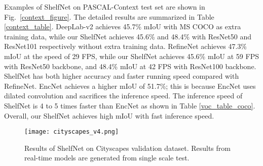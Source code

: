 \documentclass[10pt,twocolumn,letterpaper]{article}
\begin{document}
Examples of ShelfNet on PASCAL-Context test set are shown in Fig.~\ref{context_figure}. The detailed results are summarized in Table \ref{context_table}. DeepLab-v2 achieves 45.7\% mIoU with MS COCO as extra training data, while our ShelfNet achieves 45.6\% and 48.4\% with ResNet50 and ResNet101 respectively without extra training data. RefineNet achieves 47.3\% mIoU at the speed of 29 FPS, while our ShelfNet achieves 45.6\% mIoU at 59 FPS with ResNet50 backbone, and 48.4\% mIoU at 42 FPS with ResNet100 backbone. ShelfNet has both higher accuracy and faster running speed compared with RefineNet. EncNet achieves a higher mIoU of 51.7\%; this is because EncNet uses dilated convolution and sacrifices the inference speed. The inference speed of ShelfNet is 4 to 5 times faster than EncNet as shown in Table \ref{voc_table_coco}. Overall, our ShelfNet achieves high mIoU with fast inference speed.
\begin{figure*}[htb]
    \centering
        \texttt{[image: cityscapes\_v4.png]}
        \caption{\small{Results of ShelfNet on Cityscapes validation dataset. Results from real-time models are generated from single scale test.}
        }
    \label{cityscape_result}
    \label{city_figure}
\end{figure*} 
\vspace{-0.4cm}
\begin{table}[htb!]
\centering
{}
\caption{Segmentation results on PASCAL-Context  dataset}
\label{context_table}
\end{table}
\vspace{-0.8cm}
\end{document}
